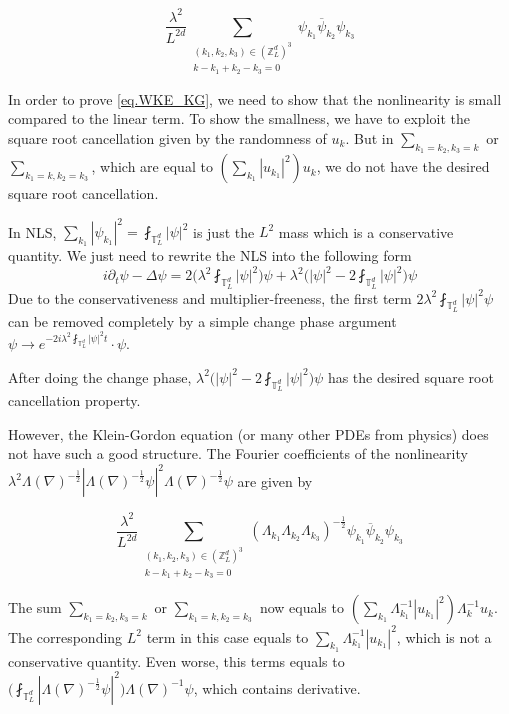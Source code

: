 \begin{equation}
 \frac{\lambda^2}{L^{2d}} \sum\limits_{\substack{(k_1,k_2,k_{3}) \in (\mathbb{Z}^d_L)^3 \\ k - k_1 + k_2 -k_3 = 0}} \psi_{k_1}\overline{\psi}_{k_2} \psi_{k_3}
\end{equation}

In order to prove \eqref{eq.WKE_KG}, we need to show that the nonlinearity is small compared to the linear term. To show the smallness, we have to exploit the square root cancellation given by the randomness of $u_k$.
But in $\sum_{k_1=k_2,k_3=k}$ or $\sum_{k_1=k,k_2=k_3}$, which are equal to $ (\sum_{k_1}|u_{k_1}|^2) u_k$, we do not have the desired square root cancellation.

In NLS, $ \sum_{k_1}|\psi_{k_1}|^2 = \fint_{\mathbb{T}_L^d}|\psi|^2$ is just the $L^2$ mass which is a conservative quantity. We just need to rewrite the NLS into the following form 
\begin{equation}
 i\partial_t\psi-\Delta\psi = 2\bigg(\lambda^2\fint_{\mathbb{T}_L^d}|\psi|^2\bigg)\psi + \lambda^2\bigg(|\psi|^2-2\fint_{\mathbb{T}_L^d}|\psi|^2\bigg)\psi
\end{equation}
Due to the conservativeness and multiplier-freeness, the first term $2\lambda^2\fint_{\mathbb{T}_L^d}|\psi|^2\psi$ can be removed completely by a simple change phase argument $\psi \rightarrow e^{-2i\lambda^2\fint_{\mathbb{T}_L^d}|\psi|^2t}\cdot \psi$. 

After doing the change phase, $\lambda^2\bigg(|\psi|^2-2\fint_{\mathbb{T}_L^d}|\psi|^2\bigg)\psi$ has the desired square root cancellation property.

However, the Klein-Gordon equation (or many other PDEs from physics) does not have such a good structure. The Fourier coefficients of the nonlinearity $\lambda^2 \Lambda(\nabla)^{-\frac{1}{2}}|\Lambda(\nabla)^{-\frac{1}{2}}\psi|^2\Lambda(\nabla)^{-\frac{1}{2}}\psi$ are given by

\begin{equation}
 \frac{\lambda^2}{L^{2d}} \sum\limits_{\substack{(k_1,k_2,k_{3}) \in (\mathbb{Z}^d_L)^3 \\ k - k_1 + k_2 -k_3 = 0}} (\Lambda_{k_1}\Lambda_{k_2}\Lambda_{k_3})^{-\frac{1}{2}}\psi_{k_1}\overline{\psi}_{k_2} \psi_{k_3}
\end{equation}

The sum $\sum_{k_1=k_2,k_3=k}$ or $\sum_{k_1=k,k_2=k_3}$ now equals to $ (\sum_{k_1}\Lambda_{k_1}^{-1}|u_{k_1}|^2) \Lambda_{k}^{-1}u_k$. The corresponding $L^2$ term in this case equals to $\sum_{k_1}\Lambda_{k_1}^{-1}|u_{k_1}|^2$, which is not a conservative quantity. Even worse, this terms equals to $\bigg(\fint_{\mathbb{T}_L^d}|\Lambda(\nabla)^{-\frac{1}{2}}\psi|^2\bigg)\Lambda(\nabla)^{-1}\psi $, which contains derivative. 


